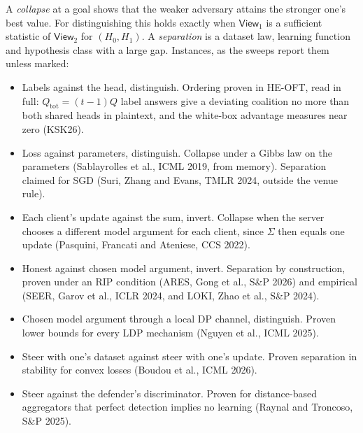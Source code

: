 \documentclass{labreport}
\newcommand{\View}{\mathsf{View}}
\begin{document}
A \emph{collapse} at a goal shows that the weaker adversary attains the
stronger one's best value. For distinguishing this holds exactly when $\View_1$
is a sufficient statistic of $\View_2$ for $(H_0,H_1)$. A \emph{separation} is a
dataset law, learning function and hypothesis class with a large gap.
Instances, as the sweeps report them unless marked:
\begin{itemize}
\item Labels against the head, distinguish. Ordering proven in HE-OFT, read in
  full: $Q_{\mathrm{tot}}=(t-1)Q$ label answers give a deviating coalition no
  more than both shared heads in plaintext, and the white-box advantage
  measures near zero (KSK26).
\item Loss against parameters, distinguish. Collapse under a Gibbs law on the
  parameters (Sablayrolles et al., ICML 2019, from memory). Separation claimed
  for SGD (Suri, Zhang and Evans, TMLR 2024, outside the venue rule).
\item Each client's update against the sum, invert. Collapse when the server
  chooses a different model argument for each client, since $\Sigma$ then equals one
  update (Pasquini, Francati and Ateniese, CCS 2022).
\item Honest against chosen model argument, invert. Separation by construction,
  proven under an RIP condition (ARES, Gong et al., S\&P 2026) and empirical
  (SEER, Garov et al., ICLR 2024, and LOKI, Zhao et al., S\&P 2024).
\item Chosen model argument through a local DP channel, distinguish. Proven lower
  bounds for every LDP mechanism (Nguyen et al., ICML 2025).
\item Steer with one's dataset against steer with one's update. Proven
  separation in stability for convex losses (Boudou et al., ICML 2026).
\item Steer against the defender's discriminator. Proven for distance-based
  aggregators that perfect detection implies no learning (Raynal and Troncoso,
  S\&P 2025).
\end{itemize}
\end{document}
